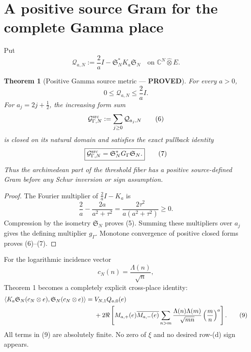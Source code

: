 \documentclass[11pt]{article}
\newcommand{\PROVED}{\textcolor{green!40!black}{\textbf{PROVED}}}
\newtheorem{theorem}{Theorem}
\begin{document}
\section{A positive source Gram for the complete Gamma place}

Put
\begin{equation}
 \mathcal Q_{a,N}:=\frac2aI-\mathfrak S_N^*K_a\mathfrak S_N
 \quad\text{on }\mathbb C^N\widehat\otimes E.                \tag{4}
\end{equation}

\begin{theorem}[Positive Gamma source metric --- \PROVED]
For every $a>0$,
\begin{equation}
                         0\le\mathcal Q_{a,N}\le\frac2aI.    \tag{5}
\end{equation}
For $a_j=2j+\frac12$, the increasing form sum
\begin{equation}
 \mathcal G_{\Gamma,N}^{\rm src}
 :=\sum_{j\ge0}\mathcal Q_{a_j,N}                            \tag{6}
\end{equation}
is closed on its natural domain and satisfies the exact pullback identity
\begin{equation}
 \boxed{
 \mathcal G_{\Gamma,N}^{\rm src}
 =\mathfrak S_N^*G_\Gamma\mathfrak S_N.}                    \tag{7}
\end{equation}
Thus the archimedean part of the threshold fiber has a positive
source-defined Gram before any Schur inversion or sign assumption.
\end{theorem}

\begin{proof}
The Fourier multiplier of $\frac2aI-K_a$ is
\[
 \frac2a-\frac{2a}{a^2+\tau^2}
 =\frac{2\tau^2}{a(a^2+\tau^2)}\ge0.
\]
Compression by the isometry $\mathfrak S_N$ proves (5).  Summing these
multipliers over $a_j$ gives the defining multiplier $g_\Gamma$.
Monotone convergence of positive closed forms proves (6)--(7).
\end{proof}

For the logarithmic incidence vector
\begin{equation}
 c_N(n)=\frac{\Lambda(n)}{\sqrt n},                           \tag{8}
\end{equation}
Theorem 1 becomes a completely explicit cross-place identity:
\begin{align}
 \langle K_a\mathfrak S_N(c_N\otimes e),
                  \mathfrak S_N(c_N\otimes e)\rangle
={}&V_{N,1}Q_{a,0}(e)\notag\\
 &+2\Re\left[
 M_{a,+}(e)\overline{M_{a,-}(e)}
 \sum_{n>m}\frac{\Lambda(n)\Lambda(m)}{\sqrt{mn}}
              \left(\frac mn\right)^a
 \right].                                                   \tag{9}
\end{align}
All terms in (9) are absolutely finite.  No zero of $\xi$ and no desired
row-(d) sign appears.
\end{document}

